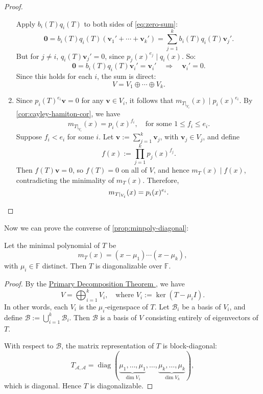 \begin{proof}
\begin{enumerate}
    Apply \(b_i(T) q_i(T)\) to both sides of \eqref{eq:zero-sum}:
    \[
    \mathbf{0} = b_i(T) q_i(T) (\mathbf{v}_1' + \cdots + \mathbf{v}_k') = \sum_{j=1}^k b_i(T) q_i(T) \mathbf{v}_j'.
    \]
    But for \(j \neq i\), \(q_i(T) \mathbf{v}_j' = 0\), since \(p_j(x)^{e_j} \mid q_i(x)\). So:
    \[
    \mathbf{0} = b_i(T) q_i(T) \mathbf{v}_i' = \mathbf{v}_i' \quad \Rightarrow \quad \mathbf{v}_i' = 0.
    \]
    Since this holds for each \(i\), the sum is direct:
    \begin{equation}
        V = V_1 \oplus \cdots \oplus V_k. \label{eq:direct-sum}
    \end{equation}

    \item Since \(p_i(T)^{e_i} \mathbf{v} = 0\) for any \(\mathbf{v} \in V_i\), it follows that \(m_{T|_{V_i}}(x) \mid p_i(x)^{e_i}\). By \autoref{cor:cayley-hamiton-cor}, we have
    \[
    m_{T|_{V_i}}(x) = p_i(x)^{f_i}, \quad \text{for some } 1 \leq f_i \leq e_i.
    \]
    Suppose \(f_i < e_i\) for some \(i\). Let \(\mathbf{v} := \sum_{j=1}^k \mathbf{v}_j\), with \(\mathbf{v}_j \in V_j\), and define
    \[
    f(x) := \prod_{j=1}^k p_j(x)^{f_j}.
    \]
    Then \(f(T) \mathbf{v} = 0\), so \(f(T) = 0\) on all of \(V\), and hence \(m_T(x) \mid f(x)\), contradicting the minimality of \(m_T(x)\). Therefore,
    \[
    m_{T|_{V_i}}(x) = p_i(x)^{e_i}. \qedhere
    \]
\end{enumerate}
\end{proof}

Now we can prove the converse of \autoref{prop:minpoly-diagonal}:
\begin{corollary}\label{cor:diag-criterion}
Let the minimal polynomial of \(T\) be
\[
m_T(x) = (x - \mu_1) \cdots (x - \mu_k),
\]
with \(\mu_i \in \mathbb{F}\) distinct. Then \(T\) is diagonalizable over \(\mathbb{F}\). 
\end{corollary}

\begin{proof}
By the \hyperref[thm:primary-decomposition]{Primary Decomposition Theorem }, we have
\[
V = \bigoplus_{i = 1}^{k} V_i, \quad \text{where } V_i := \ker(T - \mu_i I).
\]
In other words, each \(V_i\) is the \(\mu_i\)-eigenspace of \(T\). Let \(\mathcal{B}_i\) be a basis of \(V_i\), and define \(\mathcal{B} := \bigcup_{i = 1}^k \mathcal{B}_i\). Then \(\mathcal{B}\) is a basis of \(V\) consisting entirely of eigenvectors of \(T\).

With respect to \(\mathcal{B}\), the matrix representation of \(T\) is block-diagonal:
\[
T_{\mathcal{A}, \mathcal{A}} = \operatorname{diag}(\underbrace{\mu_1, \dots, \mu_1}_{\dim V_1}, \dots, \underbrace{\mu_k, \dots, \mu_k}_{\dim V_k}),
\]
which is diagonal. Hence \(T\) is diagonalizable.
\end{proof}


